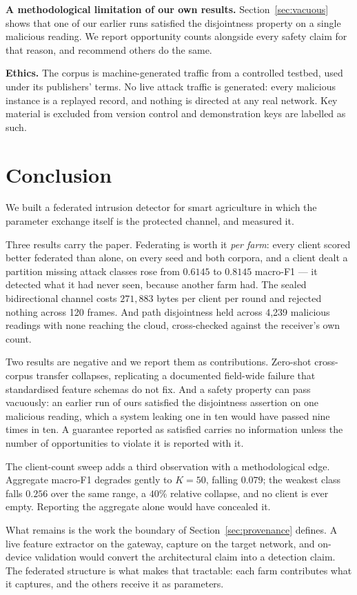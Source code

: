 \documentclass[conference]{IEEEtran}
\begin{document}
\textbf{A methodological limitation of our own results.} Section~\ref{sec:vacuous} shows that one
of our earlier runs satisfied the disjointness property on a single malicious reading. We report
opportunity counts alongside every safety claim for that reason, and recommend others do the same.

\textbf{Ethics.} The corpus is machine-generated traffic from a controlled testbed, used under its
publishers' terms. No live attack traffic is generated: every malicious instance is a replayed
record, and nothing is directed at any real network. Key material is excluded from version
control and demonstration keys are labelled as such.

\section{Conclusion}
We built a federated intrusion detector for smart agriculture in which the parameter
exchange itself is the protected channel, and measured it.

Three results carry the paper. Federating is worth it \emph{per farm}: every client scored better
federated than alone, on every seed and both corpora, and a client dealt a partition missing
attack classes rose from $0.6145$ to $0.8145$ macro-F1 --- it detected what it had never seen,
because another farm had. The sealed bidirectional channel costs $271{,}883$ bytes per client per
round and rejected nothing across 120 frames. And path disjointness held across 4{,}239 malicious
readings with none reaching the cloud, cross-checked against the receiver's own count.

Two results are negative and we report them as contributions. Zero-shot cross-corpus transfer
collapses, replicating a documented field-wide failure that standardised feature schemas do not
fix. And a safety property can pass vacuously: an earlier run of ours satisfied the disjointness
assertion on one malicious reading, which a system leaking one in ten would have passed nine times
in ten. A guarantee reported as satisfied carries no information unless the number of
opportunities to violate it is reported with it.

The client-count sweep adds a third observation with a methodological edge. Aggregate macro-F1
degrades gently to $K = 50$, falling $0.079$; the weakest class falls $0.256$ over the same range,
a $40\%$ relative collapse, and no client is ever empty. Reporting the aggregate alone would have
concealed it.

What remains is the work the boundary of Section~\ref{sec:provenance} defines. A live feature
extractor on the gateway, capture on the target network, and on-device validation would convert
the architectural claim into a detection claim. The federated structure is what makes that
tractable: each farm contributes what it captures, and the others receive it as parameters.



\end{document}
